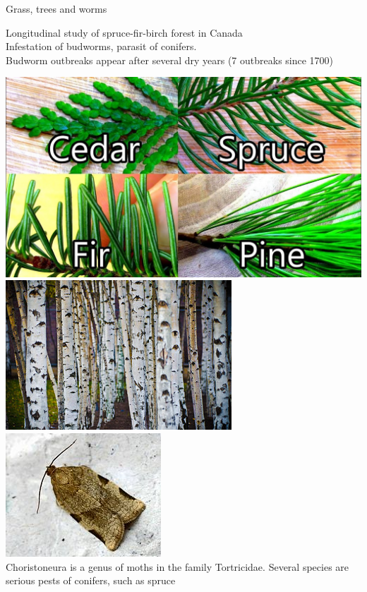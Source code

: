 \documentclass[11,aspectratio=1610]{beamer}
\begin{document}
\begin{frame}{Grass, trees and worms}


Longitudinal study of  spruce-fir-birch forest in Canada \\
\vfill
Infestation of \alert{budworms}, parasit of conifers.\\
\vfill
Budworm outbreaks appear after several dry years (7 outbreaks since 1700)
\vfill



\centering 
\includegraphics[height=0.3\textheight]{img/fir_spruce_pine_cedar.jpg}
\includegraphics[height=0.3\textheight]{img/birch.jpg}
\includegraphics[height=0.3\textheight]{img/spruce_budworm.jpg}\\
\tiny{Choristoneura is a genus of moths in the family Tortricidae. Several species are serious pests of conifers, such as spruce}

\vfill

\end{frame}
\end{document}
